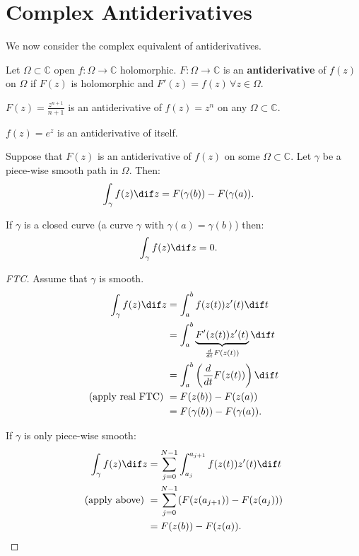 \section{Complex Antiderivatives}

We now consider the complex equivalent of antiderivatives.

\begin{definition}[Antiderivatives]
Let $\Omega \subset \mathbb{C}$ open $f:\Omega \rightarrow \mathbb{C}$ holomorphic. $F:\Omega \rightarrow \mathbb{C}$ is an \textbf{antiderivative} of $f(z)$ on $\Omega$ if $F(z)$ is holomorphic and $F'(z) = f(z) \, \forall z\in\Omega $.
\end{definition}

\begin{example}
$F(z) = \frac{z^{n+1}}{n+1}$ is an antiderivative of $f(z) = z^n$ on any $\Omega \subset \mathbb{C}$.
\end{example}
\begin{example}
$f(z) = e^z$ is an antiderivative of itself.
\end{example}

\begin{theorem}
Suppose that $F(z)$ is an antiderivative of $f(z)$ on some $\Omega \subset \mathbb{C}$. Let $\gamma$ be a piece-wise smooth path in $\Omega$. Then:
\begin{align*}
    \int_\gamma f(z)  \dif z &= F(\gamma(b)) - F(\gamma(a)).
\end{align*}
\end{theorem}


\begin{corollary}
If $\gamma$ is a closed curve (a curve $\gamma$ with $\gamma(a)=\gamma(b)$) then:
\begin{align*}
    \int_\gamma f(z)  \dif z &= 0.
\end{align*}

\end{corollary}

\begin{proof}[FTC]
Assume that $\gamma$ is smooth.
\begin{align*}
    \int_\gamma f(z)  \dif z &= \int_a^b f(z(t)) z'(t)  \dif t\\
    &= \int_a^b \underbrace{F'(z(t)) z'(t)}_{\frac{d}{  dt} F(z(t))}  \dif t\\
    &= \int_a^b \left( \frac{d}{ dt} F(z(t)) \right)  \dif t\\
    \text{(apply real FTC) }&= F(z(b))-F(z(a))\\
    &= F(\gamma(b)) - F(\gamma(a)).
\end{align*}

If $\gamma$ is only piece-wise smooth:
\begin{align*}
    \int_\gamma f(z) \dif z &= \sum_{j=0}^{N-1} \int_ {a_j}^{a_{j+1}} f(z(t))z'(t) \dif t\\
   \text{(apply above) } &= \sum_{j=0}^{N-1} (F(z(a_{j+1}))-F(z(a_j)))\\
   &= F(z(b)) - F(z(a)).
\end{align*}
\end{proof}


